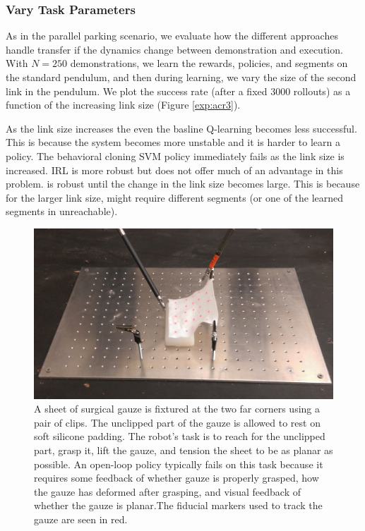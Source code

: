 \subsubsection{Vary Task Parameters}
As in the parallel parking scenario, we evaluate how the different approaches handle transfer if the dynamics change between demonstration and execution.
With $N=250$ demonstrations, we learn the rewards, policies, and segments on the standard pendulum, and then during learning, we vary the size of the second link in the pendulum.
We plot the success rate (after a fixed 3000 rollouts) as a function of the increasing link size (Figure \ref{exp:acr3}).

As the link size increases the even the basline Q-learning becomes less successful. This is because the system becomes more unstable and it is harder to learn a policy.
The behavioral cloning SVM policy immediately fails as the link size is increased.
IRL is more robust but does not offer much of an advantage in this problem.
\hirl is robust until the change in the link size becomes large.
This is because for the larger link size, \hirl might require different segments (or one of the learned segments in unreachable).



\begin{figure}[t]
\centering
    \includegraphics[width=0.8\columnwidth]{exp/IMAG0249.jpg}
    \caption{A sheet of surgical gauze is fixtured at the two far corners using a pair of clips. The unclipped part of the gauze is allowed to rest on soft silicone padding. The robot's task is to reach for the unclipped part, grasp it, lift the gauze, and tension the sheet to be as planar as possible.
An open-loop policy typically fails on this task because it requires some feedback of whether gauze is properly grasped, how the gauze has deformed after grasping, and visual feedback of whether the gauze is planar.The fiducial markers used to track the gauze are seen in red.
    }
    \label{exp:dvrk2}
\end{figure}



